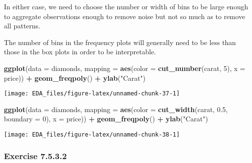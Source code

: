 \documentclass[]{book}
\newenvironment{Shaded}{\begin{snugshade}}{\end{snugshade}}
\newcommand{\DataTypeTok}[1]{\textcolor[rgb]{0.13,0.29,0.53}{#1}}
\newcommand{\DecValTok}[1]{\textcolor[rgb]{0.00,0.00,0.81}{#1}}
\newcommand{\FloatTok}[1]{\textcolor[rgb]{0.00,0.00,0.81}{#1}}
\newcommand{\KeywordTok}[1]{\textcolor[rgb]{0.13,0.29,0.53}{\textbf{#1}}}
\newcommand{\NormalTok}[1]{#1}
\newcommand{\OperatorTok}[1]{\textcolor[rgb]{0.81,0.36,0.00}{\textbf{#1}}}
\newcommand{\StringTok}[1]{\textcolor[rgb]{0.31,0.60,0.02}{#1}}
\theoremstyle{plain}
\theoremstyle{remark}
\begin{document}
In either case, we need to choose the number or width of bins to be
large enough to aggregate observations enough to remove noise but not so
much as to remove all patterns.

The number of bins in the frequency plots will generally need to be less
than those in the box plots in order to be interpretable.

\begin{Shaded}
\begin{Highlighting}[]
\KeywordTok{ggplot}\NormalTok{(}\DataTypeTok{data =}\NormalTok{ diamonds,}
       \DataTypeTok{mapping =} \KeywordTok{aes}\NormalTok{(}\DataTypeTok{color =} \KeywordTok{cut_number}\NormalTok{(carat, }\DecValTok{5}\NormalTok{), }\DataTypeTok{x =}\NormalTok{ price)) }\OperatorTok{+}
\StringTok{  }\KeywordTok{geom_freqpoly}\NormalTok{() }\OperatorTok{+}
\StringTok{  }\KeywordTok{ylab}\NormalTok{(}\StringTok{"Carat"}\NormalTok{)}
\end{Highlighting}
\end{Shaded}

\begin{center}\texttt{[image: EDA\_files/figure-latex/unnamed-chunk-37-1]} \end{center}

\begin{Shaded}
\begin{Highlighting}[]
\KeywordTok{ggplot}\NormalTok{(}\DataTypeTok{data =}\NormalTok{ diamonds,}
       \DataTypeTok{mapping =} \KeywordTok{aes}\NormalTok{(}\DataTypeTok{color =} \KeywordTok{cut_width}\NormalTok{(carat, }\FloatTok{0.5}\NormalTok{, }\DataTypeTok{boundary =} \DecValTok{0}\NormalTok{), }\DataTypeTok{x =}\NormalTok{ price)) }\OperatorTok{+}
\StringTok{  }\KeywordTok{geom_freqpoly}\NormalTok{() }\OperatorTok{+}
\StringTok{  }\KeywordTok{ylab}\NormalTok{(}\StringTok{"Carat"}\NormalTok{)}
\end{Highlighting}
\end{Shaded}

\begin{center}\texttt{[image: EDA\_files/figure-latex/unnamed-chunk-38-1]} \end{center}

\hypertarget{exercise-7.5.3.2}{%
\subsubsection*{\texorpdfstring{Exercise
{7.5.3.2}}{Exercise 7.5.3.2}}\label{exercise-7.5.3.2}}
\end{document}
